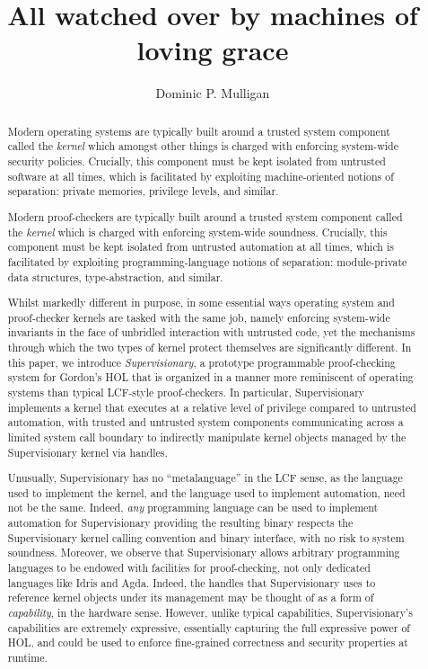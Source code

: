 \documentclass[a4paper, UKenglish, cleveref, autoref, thm-restate]{lipics-v2021}
\title{All watched over by machines of loving grace}
\author{Dominic P. Mulligan}{Automated Reasoning Group, Amazon Web Services\footnote{All work done whilst at Arm Research} \and \url{www.dominic-mulligan.co.uk}}{dominic.p.mulligan@gmail.com}{}{}
\begin{document}
\maketitle

\begin{abstract}
Modern operating systems are typically built around a trusted system component called the \emph{kernel} which amongst other things is charged with enforcing system-wide security policies.
Crucially, this component must be kept isolated from untrusted software at all times, which is facilitated by exploiting machine-oriented notions of separation: private memories, privilege levels, and similar.

Modern proof-checkers are typically built around a trusted system component called the \emph{kernel} which is charged with enforcing system-wide soundness.
Crucially, this component must be kept isolated from untrusted automation at all times, which is facilitated by exploiting programming-language notions of separation: module-private data structures, type-abstraction, and similar.

Whilst markedly different in purpose, in some essential ways operating system and proof-checker kernels are tasked with the same job, namely enforcing system-wide invariants in the face of unbridled interaction with untrusted code, yet the mechanisms through which the two types of kernel protect themselves are significantly different.
In this paper, we introduce \emph{Supervisionary}, a prototype programmable proof-checking system for Gordon's HOL that is organized in a manner more reminiscent of operating systems than typical LCF-style proof-checkers.
In particular, Supervisionary implements a kernel that executes at a relative level of privilege compared to untrusted automation, with trusted and untrusted system components communicating across a limited system call boundary to indirectly manipulate kernel objects managed by the Supervisionary kernel via handles.

Unusually, Supervisionary has no ``metalanguage'' in the LCF sense, as the language used to implement the kernel, and the language used to implement automation, need not be the same.
Indeed, \emph{any} programming language can be used to implement automation for Supervisionary providing the resulting binary respects the Supervisionary kernel calling convention and binary interface, with no risk to system soundness.
Moreover, we observe that Supervisionary allows arbitrary programming languages to be endowed with facilities for proof-checking, not only dedicated languages like Idris and Agda.
Indeed, the handles that Supervisionary uses to reference kernel objects under its management may be thought of as a form of \emph{capability}, in the hardware sense.
However, unlike typical capabilities, Supervisionary's capabilities are extremely expressive, essentially capturing the full expressive power of HOL, and could be used to enforce fine-grained correctness and security properties at runtime.
\end{abstract}
\end{document}
